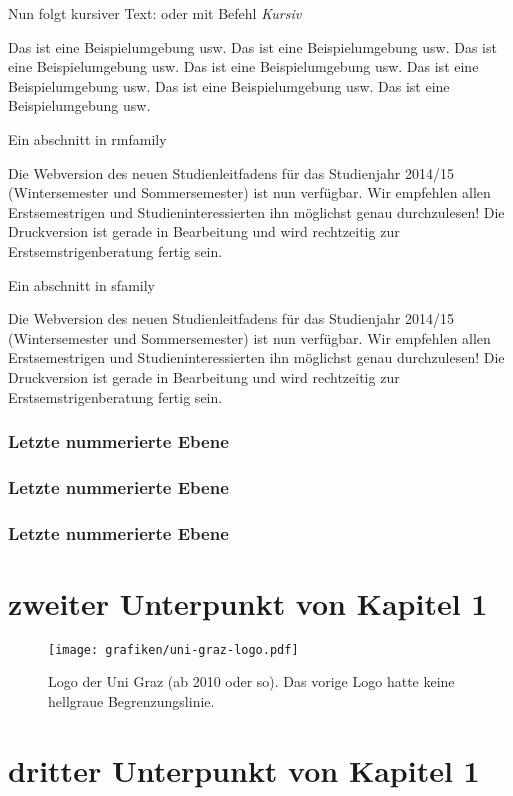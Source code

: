 Nun folgt kursiver Text: oder mit Befehl \textit{Kursiv}

\begin{itshape}
Das ist eine Beispielumgebung usw. Das ist eine Beispielumgebung usw. Das ist eine Beispielumgebung usw. Das ist eine Beispielumgebung usw. Das ist eine Beispielumgebung usw. Das ist eine Beispielumgebung usw. Das ist eine Beispielumgebung usw.
\end{itshape}


Ein abschnitt in rmfamily

\rmfamily

Die Webversion des neuen Studienleitfadens für das Studienjahr 2014/15 (Wintersemester und Sommersemester) ist nun verfügbar.
Wir empfehlen allen Erstsemestrigen und Studieninteressierten ihn möglichst genau durchzulesen! Die Druckversion ist gerade in Bearbeitung und wird rechtzeitig zur Erstsemstrigenberatung fertig sein.

\familydefault

Ein abschnitt in sfamily

\sffamily

Die Webversion des neuen Studienleitfadens für das Studienjahr 2014/15 (Wintersemester und Sommersemester) ist nun verfügbar.
Wir empfehlen allen Erstsemestrigen und Studieninteressierten ihn möglichst genau durchzulesen! Die Druckversion ist gerade in Bearbeitung und wird rechtzeitig zur Erstsemstrigenberatung fertig sein.

\familydefault


\subsubsection{Letzte nummerierte Ebene}

\subsubsection{Letzte nummerierte Ebene}

\subsubsection{Letzte nummerierte Ebene}

\clearpage


\section{zweiter Unterpunkt von Kapitel 1}

\begin{figure}[hbtp]
\centering 
\texttt{[image: grafiken/uni-graz-logo.pdf]} 
\caption[Logo der Uni Graz]{Logo der Uni Graz (ab 2010 oder so). Das vorige Logo hatte keine hellgraue Begrenzungslinie.}
\end{figure}


\section{dritter Unterpunkt von Kapitel 1}







